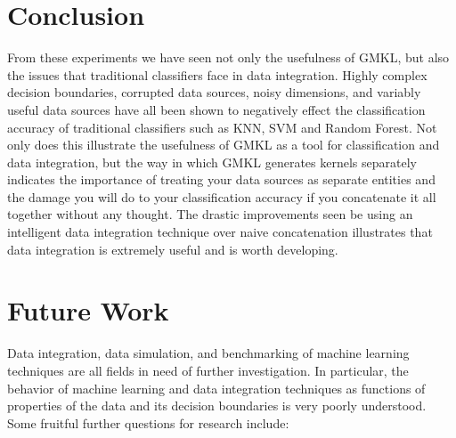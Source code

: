 \documentclass{article}
\begin{document}
\section*{Conclusion}
From these experiments we have seen not only the usefulness of GMKL, but also
the issues that traditional classifiers face in data integration. Highly
complex decision boundaries, corrupted data sources, noisy dimensions, and
variably useful data sources have all been shown to negatively effect the
classification accuracy of traditional classifiers such as KNN, SVM and Random
Forest. Not only does this illustrate the usefulness of GMKL as a tool for
classification and data integration, but the way in which GMKL generates
kernels separately indicates the importance of treating your data sources as
separate entities and the damage you will do to your classification accuracy if
you concatenate it all together without any thought. The drastic improvements
seen be using an intelligent data integration technique over naive
concatenation illustrates that data integration is extremely useful and is
worth developing.


\section*{Future Work}
Data integration, data simulation, and benchmarking of machine learning
techniques are all fields in need of further investigation. In particular, the
behavior of machine learning and data integration techniques as functions of
properties of the data and its decision boundaries is very poorly understood.
Some fruitful further questions for research include:
\end{document}
